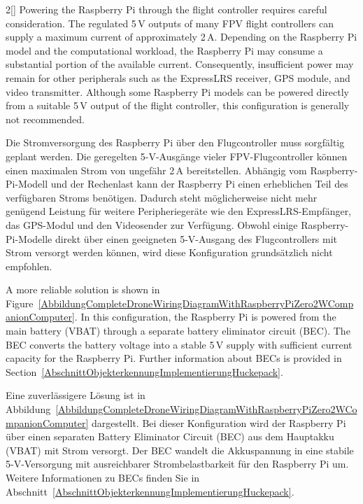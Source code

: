\begin{paracol}{2}[]
Powering the Raspberry Pi through the flight controller requires careful consideration. The regulated 5\,V outputs of many FPV flight controllers can supply a maximum current of approximately 2\,A. Depending on the Raspberry Pi model and the computational workload, the Raspberry Pi may consume a substantial portion of the available current. Consequently, insufficient power may remain for other peripherals such as the ExpressLRS receiver, GPS module, and video transmitter. Although some Raspberry Pi models can be powered directly from a suitable 5\,V output of the flight controller, this configuration is generally not recommended.

\colger

Die Stromversorgung des Raspberry Pi über den Flugcontroller muss sorgfältig geplant werden. Die geregelten 5-V-Ausgänge vieler FPV-Flugcontroller können einen maximalen Strom von ungefähr 2\,A bereitstellen. Abhängig vom Raspberry-Pi-Modell und der Rechenlast kann der Raspberry Pi einen erheblichen Teil des verfügbaren Stroms benötigen. Dadurch steht möglicherweise nicht mehr genügend Leistung für weitere Peripheriegeräte wie den ExpressLRS-Empfänger, das GPS-Modul und den Videosender zur Verfügung. Obwohl einige Raspberry-Pi-Modelle direkt über einen geeigneten 5-V-Ausgang des Flugcontrollers mit Strom versorgt werden können, wird diese Konfiguration grundsätzlich nicht empfohlen.

\coleng

A more reliable solution is shown in Figure~\ref{AbbildungCompleteDroneWiringDiagramWithRaspberryPiZero2WCompanionComputer}. In this configuration, the Raspberry Pi is powered from the main battery (VBAT) through a separate battery eliminator circuit (BEC). The BEC converts the battery voltage into a stable 5\,V supply with sufficient current capacity for the Raspberry Pi. Further information about BECs is provided in Section~\ref{AbschnittObjekterkennungImplementierungHuckepack}.

\colger

Eine zuverlässigere Lösung ist in Abbildung~\ref{AbbildungCompleteDroneWiringDiagramWithRaspberryPiZero2WCompanionComputer} dargestellt. Bei dieser Konfiguration wird der Raspberry Pi über einen separaten Battery Eliminator Circuit (BEC) aus dem Hauptakku (VBAT) mit Strom versorgt. Der BEC wandelt die Akkuspannung in eine stabile 5-V-Versorgung mit ausreichbarer Strombelastbarkeit für den Raspberry Pi um. Weitere Informationen zu BECs finden Sie in Abschnitt~\ref{AbschnittObjekterkennungImplementierungHuckepack}.


\end{paracol}
